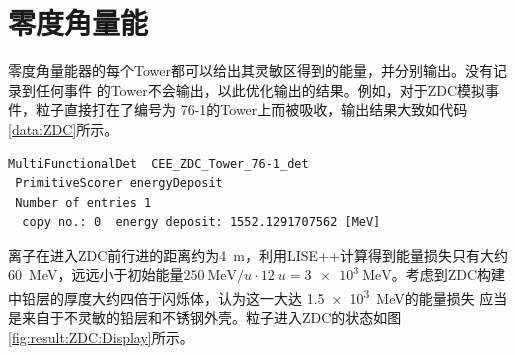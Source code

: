 \documentclass[bachelor,openany,oneside,color]{buaathesis}
\begin{document}
\section{零度角量能}

零度角量能器的每个Tower都可以给出其灵敏区得到的能量，并分别输出。没有记录到任何事件
的Tower不会输出，以此优化输出的结果。例如，对于ZDC模拟事件，粒子直接打在了编号为
76-1的Tower上而被吸收，输出结果大致如代码\ref{data:ZDC}所示。
\begin{lstlisting}[caption={ZDC输出},label={data:ZDC},firstnumber=3893,lastline=3896]
 MultiFunctionalDet  CEE_ZDC_Tower_76-1_det
 PrimitiveScorer energyDeposit
 Number of entries 1
  copy no.: 0  energy deposit: 1552.1291707562 [MeV]
\end{lstlisting}
离子在进入ZDC前行进的距离约为\SI{4}{\meter}，利用LISE++计算得到能量损失只有大约
\SI{60}{\mega\eV}，远远小于初始能量$\SI{250}{\mega\eV/u}\cdot\SI{12}{u}=
\SI{3e3}{\mega\eV}$。考虑到ZDC构建中铅层的厚度大约四倍于闪烁体，认为这一大达
\SI{1.5e3}{\mega\eV}的能量损失
应当是来自于不灵敏的铅层和不锈钢外壳。粒子进入ZDC的状态如图
\ref{fig:result:ZDC:Display}所示。
\end{document}
